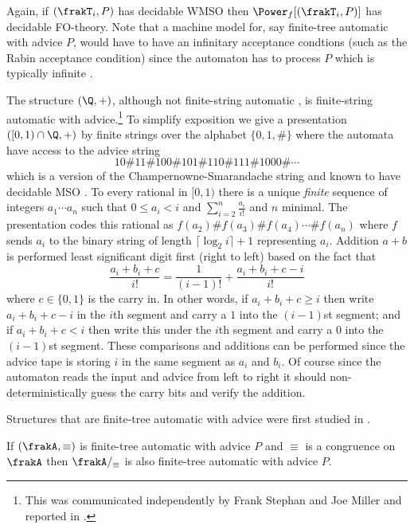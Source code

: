 Again, if $(\frakT_i,P)$ has decidable WMSO then $\Power_f[(\frakT_i,P)]$ has decidable FO-theory. Note that a machine model for, say finite-tree automatic with advice $P$, would
have to have an infinitary acceptance condtions (such as the Rabin acceptance condition) since the automaton has to process $P$ which is typically infinite \cite{CoLo07}.

\begin{example} The structure $(\Q,+)$, although not finite-string automatic \cite{Tsan11}, is finite-string automatic with 
advice.\footnote{This was communicated independently by Frank Stephan and Joe Miller and reported in \cite{Nies07}.}
To simplify exposition we give a presentation $([0,1) \cap \Q,+)$ by finite strings
over the alphabet $\{0,1,\#\}$ where the automata have access to the advice string
\[
10\#11\#100\#101\#110\#111\#1000\#\cdots
\]
which is a version of the Champernowne-Smarandache string and known to have decidable MSO \cite{Bara07}. %
To every rational in $[0,1)$ there is a unique {\em finite}
sequence of integers  $a_1 \cdots a_n$ such that $0 \leq a_i < i$ 
and $\sum_{i=2}^n \frac{a_i}{i!}$ and $n$ minimal. The presentation codes this rational as
$f(a_2)\#f(a_3)\#f(a_4) \cdots \#f(a_n)$ where $f$ sends $a_i$ to the binary string of length $\lceil  \log_2 i \rceil +1$  representing $a_i$. Addition $a+b$ is performed least significant digit first (right to left) based on the fact that 
\[
\frac{a_i + b_i + c}{i!} = \frac{1}{(i-1)!} + \frac{a_i + b_i + c - i}{i!}
\]
where $c \in \{0,1\}$ is the carry in. In other words, if $a_i+b_i+c \geq i$ then write $a_i+b_i+c-i$ in the $i$th segment and carry a $1$ into the $(i-1)$st segment; and if $a_i +b_i + c < i$ then write this under the $i$th segment and carry a $0$ into the $(i-1)$st segment.  These comparisons and additions can be performed since the advice tape is storing $i$ in the same segment as $a_i$ and $b_i$. Of course since the automaton reads the input and advice from left to right it should non-deterministically guess the carry bits and verify the addition.
\end{example}

Structures that are finite-tree automatic with advice were first studied in \cite{CoLo07}.

\begin{theorem} \cite{CoLo07}
If $(\frakA,\equiv)$ is finite-tree automatic with advice $P$ and $\equiv$ is a congruence on $\frakA$ then $\frakA/_\equiv$ is also finite-tree automatic with advice $P$.
\end{theorem}

